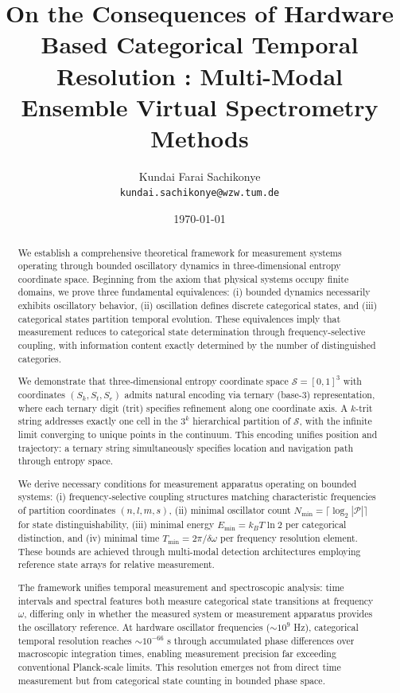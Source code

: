 \documentclass[11pt,a4paper]{article}
\title{\textbf{On the Consequences of  Hardware Based Categorical Temporal Resolution : Multi-Modal Ensemble Virtual Spectrometry Methods}}
\author{
    Kundai Farai Sachikonye\\
    \texttt{kundai.sachikonye@wzw.tum.de}
}
\date{\today}
\theoremstyle{remark}
\newcommand{\Sk}{S_k}
\newcommand{\St}{S_t}
\newcommand{\Se}{S_e}
\newcommand{\Sspace}{\mathcal{S}}
\newcommand{\partition}{\mathcal{P}}
\begin{document}
\maketitle

\begin{abstract}
We establish a comprehensive theoretical framework for measurement systems operating through bounded oscillatory dynamics in three-dimensional entropy coordinate space. Beginning from the axiom that physical systems occupy finite domains, we prove three fundamental equivalences: (i) bounded dynamics necessarily exhibits oscillatory behavior, (ii) oscillation defines discrete categorical states, and (iii) categorical states partition temporal evolution. These equivalences imply that measurement reduces to categorical state determination through frequency-selective coupling, with information content exactly determined by the number of distinguished categories.

We demonstrate that three-dimensional entropy coordinate space $\Sspace = [0,1]^3$ with coordinates $(\Sk, \St, \Se)$ admits natural encoding via ternary (base-3) representation, where each ternary digit (trit) specifies refinement along one coordinate axis. A $k$-trit string addresses exactly one cell in the $3^k$ hierarchical partition of $\Sspace$, with the infinite limit converging to unique points in the continuum. This encoding unifies position and trajectory: a ternary string simultaneously specifies location and navigation path through entropy space.

We derive necessary conditions for measurement apparatus operating on bounded systems: (i) frequency-selective coupling structures matching characteristic frequencies of partition coordinates $(n, l, m, s)$, (ii) minimal oscillator count $N_{\min} = \lceil \log_2 |\partition| \rceil$ for state distinguishability, (iii) minimal energy $E_{\min} = k_B T \ln 2$ per categorical distinction, and (iv) minimal time $T_{\min} = 2\pi/\delta\omega$ per frequency resolution element. These bounds are achieved through multi-modal detection architectures employing reference state arrays for relative measurement.

The framework unifies temporal measurement and spectroscopic analysis: time intervals and spectral features both measure categorical state transitions at frequency $\omega$, differing only in whether the measured system or measurement apparatus provides the oscillatory reference. At hardware oscillator frequencies ($\sim 10^9$ Hz), categorical temporal resolution reaches $\sim 10^{-66}$ s through accumulated phase differences over macroscopic integration times, enabling measurement precision far exceeding conventional Planck-scale limits. This resolution emerges not from direct time measurement but from categorical state counting in bounded phase space.


\end{abstract}
\end{document}
